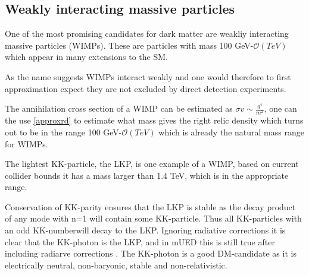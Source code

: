 \documentclass{article}
\begin{document}
\subsection{Weakly interacting massive particles}

One of the most promising candidates for dark matter are weakliy interacting massive particles (WIMPs). These are particles with mass 100 GeV-$\mathcal{O}(TeV)$ which appear in many extensions to the SM.

As the name suggests WIMPs interact weakly and one would therefore to first approximation expect they are not excluded by direct detection experiments.

The annihilation cross section of a WIMP can be estimated as $\sigma v\sim \frac{g^4}{m^2}$, one can the use \ref{approxrd} to estimate what mass gives the right relic density which turns out to be in the range 100 GeV-$\mathcal{O}(TeV)$ which is already the natural mass range for WIMPs. 


The lightest KK-particle, the LKP, is one example of a WIMP, based on current collider bounds it has a mass larger than 1.4 TeV, which is in the appropriate range. 
 
Conservation of KK-parity ensures that the LKP is stable as the decay product of  any mode with n=1 will contain some KK-particle. Thus all KK-particles with an odd KK-numberwill decay to the LKP. Ignoring radiative corrections it is clear that the KK-photon is the LKP, and in mUED this is still true after including radiarve corrections \cite{freitas2018radiative}.  The KK-photon is a good DM-candidate as it is electrically neutral, non-baryonic, stable and  non-relativistic. 
\end{document}

